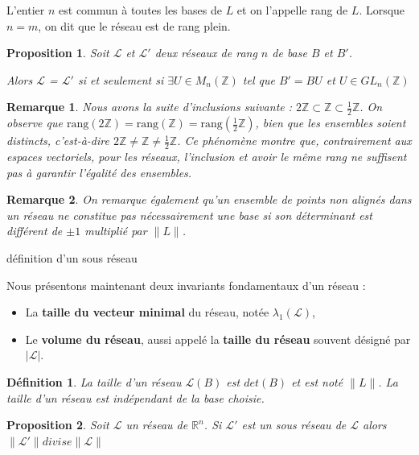 \documentclass[a4paper,12pt]{report}  %
\theoremstyle{definitionstyle}
\newtheorem{definition}{Définition}[chapter] %
\theoremstyle{examplestyle}
\theoremstyle{remarkstyle}
\newtheorem{remark}{Remarque}[chapter] %
\theoremstyle{propositionstyle}
\newtheorem{proposition}{Proposition}[chapter]  %
\theoremstyle{theoremstyle}
\theoremstyle{proofstyle}
\begin{document}
L'entier $n$ est commun à toutes les bases de $L$ et on l'appelle rang de $L$. Lorsque $n=m$, on dit que le réseau est de rang plein.
	
\begin{proposition}%
	Soit $\mathcal{L}$ et $\mathcal{L}'$ deux réseaux de rang $n$ de base $B$ et $B'$.
		
	Alors $\mathcal{L}$ = $\mathcal{L}'$ si et seulement si $\exists U \in M_n(\mathbb{Z})$ tel que $B'=BU$ et $U \in GL_n(\mathbb{Z})$
\end{proposition}

\begin{remark}
	Nous avons la suite d'inclusions suivante : $2\mathbb{Z} \subset \mathbb{Z} \subset \frac{1}{2}\mathbb{Z}$. On observe que $\text{rang}(2\mathbb{Z}) = \text{rang}(\mathbb{Z}) = \text{rang}(\frac{1}{2}\mathbb{Z})$, bien que les ensembles soient distincts, c'est-à-dire $2\mathbb{Z} \neq \mathbb{Z} \neq \frac{1}{2}\mathbb{Z}$. Ce phénomène montre que, contrairement aux espaces vectoriels, pour les réseaux, l'inclusion et avoir le même rang ne suffisent pas à garantir l'égalité des ensembles.
\end{remark}

\begin{remark}
	On remarque également qu'un ensemble de points non alignés dans un réseau ne constitue pas nécessairement une base si son déterminant est différent de $\pm 1$ multiplié par $\|L\|$.
\end{remark}


définition d'un sous réseau

Nous présentons maintenant deux invariants fondamentaux d'un réseau : 
\begin{itemize}
	\item La \textbf{taille du vecteur minimal} du réseau, notée $\lambda_1(\mathcal{L})$, 
	\item Le \textbf{volume du réseau}, aussi appelé la \textbf{taille du réseau} souvent désigné par $|\mathcal{L}|$.
\end{itemize}

\begin{definition}
	La taille d'un réseau $\mathcal{L}(B)$ est $det(B)$ et est noté $\|L\|$. La taille d'un réseau est indépendant de la base choisie.
\end{definition} 

\begin{proposition}
	Soit $\mathcal{L}$ un réseau de $\mathbb{R}^n$. Si $\mathcal{L}'$ est un sous réseau de $\mathcal{L}$ alors $\|\mathcal{L}'\| divise \|\mathcal{L}\|$	
\end{proposition}
\end{document}
